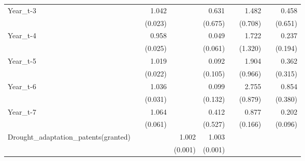 \begin{table}[htbp]
\begin{tabular}{l*{8}{D{.}{.}{-1}}}
Year\_t-3    &                     &       1.042\sym{*}  &                     &       0.631         &                     &       1.482         &                     &       0.458         \\
            &                     &     (0.023)         &                     &     (0.675)         &                     &     (0.708)         &                     &     (0.651)         \\
Year\_t-4    &                     &       0.958         &                     &       0.049\sym{**} &                     &       1.722         &                     &       0.237\sym{*}  \\
            &                     &     (0.025)         &                     &     (0.061)         &                     &     (1.320)         &                     &     (0.194)         \\
Year\_t-5    &                     &       1.019         &                     &       0.092\sym{**} &                     &       1.904         &                     &       0.362         \\
            &                     &     (0.022)         &                     &     (0.105)         &                     &     (0.966)         &                     &     (0.315)         \\
Year\_t-6    &                     &       1.036         &                     &       0.099\sym{*}  &                     &       2.755\sym{***}&                     &       0.854         \\
            &                     &     (0.031)         &                     &     (0.132)         &                     &     (0.879)         &                     &     (0.380)         \\
Year\_t-7    &                     &       1.064         &                     &       0.412         &                     &       0.877         &                     &       0.202\sym{***}\\
            &                     &     (0.061)         &                     &     (0.527)         &                     &     (0.166)         &                     &     (0.096)         \\
Drought\_adaptation\_patents(granted)&                     &                     &       1.002\sym{**} &       1.003\sym{***}&                     &                     &                     &                     \\
            &                     &                     &     (0.001)         &     (0.001)         &                     &                     &                     &                     \\

\end{tabular}
\end{table}
